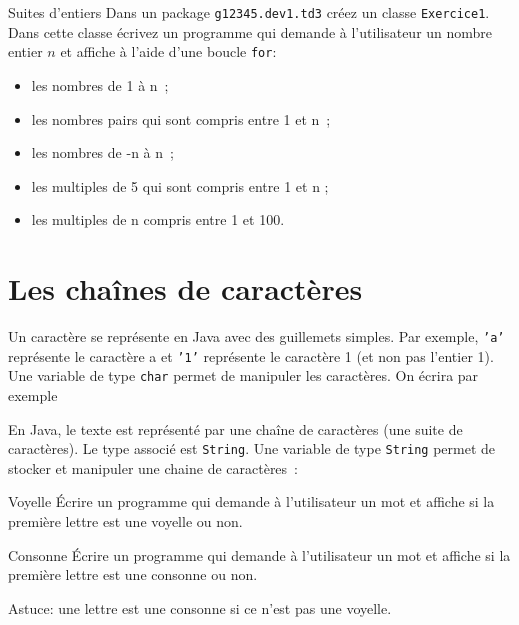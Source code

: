 \documentclass[a4paper,11pt]{article}
\begin{document}
 
	\begin{Exercice}{Suites d'entiers}	
		Dans un package \texttt{g12345.dev1.td3} créez un classe \texttt{Exercice1}.
		Dans cette classe écrivez un programme qui demande à l'utilisateur un nombre entier $n$ et affiche
		à l'aide d'une boucle \texttt{for}:
		\begin{itemize}
			\item  les nombres de 1 à n~;
			\item  les nombres pairs qui sont compris entre 1 et n~;
			\item les nombres de -n à n~;
			\item les multiples de 5 qui sont compris entre 1 et n ;
			\item les multiples de n compris entre 1 et 100.
		\end{itemize}
	\end{Exercice} 
 
\section{Les chaînes de caractères}
 
 	Un caractère se représente en Java avec des guillemets simples.
	Par exemple, \texttt{'a'} représente le caractère a et \texttt{'1'} représente le caractère 1 (et non pas l'entier 1).
	Une variable de type \texttt{char} permet de manipuler les caractères.
	On écrira par exemple  
	
	En Java, le texte est représenté par une chaîne de caractères (une suite de caractères). 
	Le type associé est \texttt{String}.
	Une variable de type \texttt{String} permet de stocker et manipuler une chaine de caractères~:

	\bigskip


	\begin{Exercice}{Voyelle}	
		\'Ecrire un programme qui demande à l'utilisateur 
		un mot et affiche si la première lettre est une voyelle ou non.
	\end{Exercice}

	\begin{Exercice}{Consonne}	
		\'Ecrire un programme qui demande à l'utilisateur 
		un mot et affiche si la première lettre est une consonne ou non.
		
		Astuce: une lettre est une consonne si ce n'est pas une voyelle.
	\end{Exercice}
\end{document}
